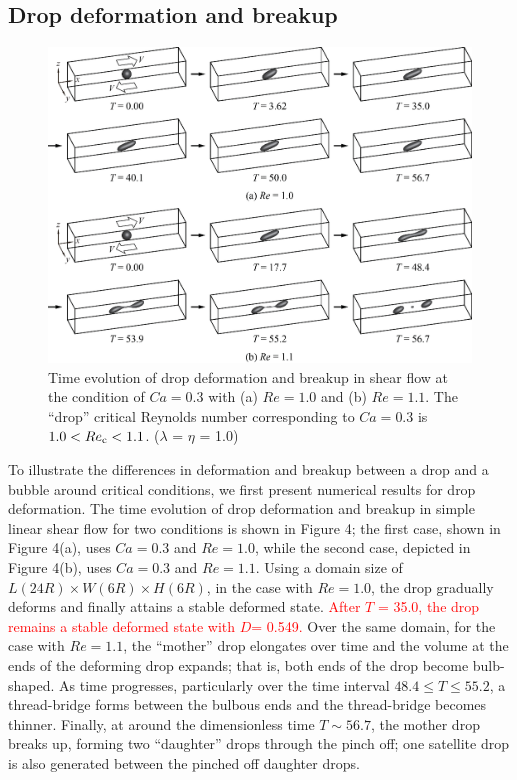 \documentclass{elsarticle}
\newcommand{\lwh}[3]{L(#1R)\times W(#2R) \times H(#3R)}
\begin{document}
\subsection{Drop deformation and breakup}\label{sec:DropBreak}
% 
\begin{figure}%
  \centering
  \textcolor{red}
{
  \includegraphics[width=\textwidth]{Figure/4-DropBreakEvol}
  \caption{Time evolution of drop deformation and breakup in shear flow at the
           condition of $Ca=0.3$ with (a) $Re=1.0$ and (b) $Re=1.1$.  The
	   ``drop'' critical Reynolds number corresponding to $Ca=0.3$ is
	   $1.0<Re_{\rm c}<1.1$.
	   ($\lambda$ = $\eta$ = 1.0)}
 }
  \label{fig:DropBreak}
\end{figure}
%
To illustrate the differences in deformation and breakup between a drop and a
bubble around critical conditions, we first present numerical results for drop
deformation.  The time evolution of drop deformation and breakup in simple
linear shear flow for two conditions is shown in Figure 4;
the first case, shown in Figure 4(a),
uses $Ca=0.3$ and $Re=1.0$, while the second case, depicted in Figure 4(b),
uses $Ca=0.3$ and $Re=1.1$.  Using a domain size of $\lwh{24}{6}{6}$, in the
case with $Re=1.0$, the drop gradually deforms and finally attains a stable
deformed state. 
\textcolor{red}
{
After $T$ = 35.0, the drop remains a stable deformed state with $D$= 0.549.
}
Over the same domain, for the case with
$Re=1.1$, the ``mother'' drop elongates over time and the volume at the ends of
the deforming drop expands; that is, both ends of the drop become bulb-shaped.
As time progresses, particularly over the time interval $48.4 \leq T \leq
55.2$, a thread-bridge forms between the bulbous ends and the thread-bridge
becomes thinner.  Finally, at around the dimensionless time $T\sim 56.7$, the
mother drop breaks up, forming two ``daughter'' drops through the pinch off;
one satellite drop is also generated between the pinched off daughter drops.
\end{document}
